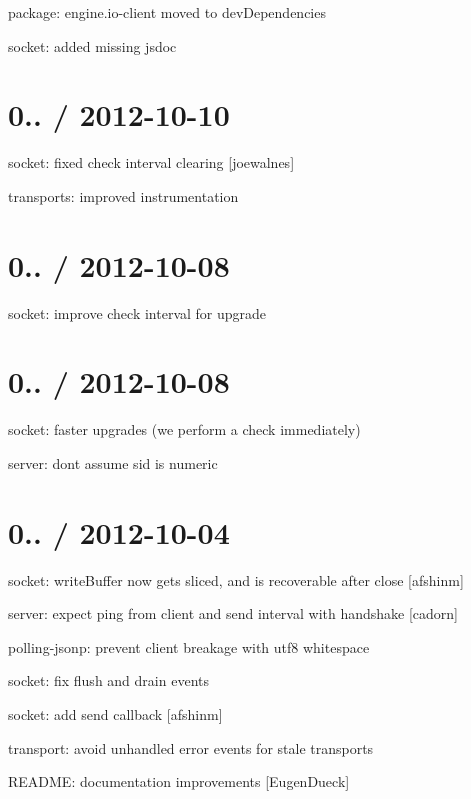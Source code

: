 \begin{DoxyItemize}
\item package\+: {\ttfamily engine.\+io-\/client} moved to {\ttfamily dev\+Dependencies}
\item socket\+: added missing jsdoc
\end{DoxyItemize}

\section*{0.. / 2012-\/10-\/10 }


\begin{DoxyItemize}
\item socket\+: fixed check interval clearing \mbox{[}joewalnes\mbox{]}
\item transports\+: improved instrumentation
\end{DoxyItemize}

\section*{0.. / 2012-\/10-\/08 }


\begin{DoxyItemize}
\item socket\+: improve check interval for upgrade
\end{DoxyItemize}

\section*{0.. / 2012-\/10-\/08 }


\begin{DoxyItemize}
\item socket\+: faster upgrades (we perform a check immediately)
\item server\+: don\textquotesingle{}t assume sid is numeric
\end{DoxyItemize}

\section*{0.. / 2012-\/10-\/04 }


\begin{DoxyItemize}
\item socket\+: {\ttfamily write\+Buffer} now gets sliced, and is recoverable after {\ttfamily close} \mbox{[}afshinm\mbox{]}
\item server\+: expect ping from client and send interval with handshake \mbox{[}cadorn\mbox{]}
\item polling-\/jsonp\+: prevent client breakage with utf8 whitespace
\item socket\+: fix {\ttfamily flush} and {\ttfamily drain} events
\item socket\+: add {\ttfamily send} callback \mbox{[}afshinm\mbox{]}
\item transport\+: avoid unhandled error events for stale transports
\item R\+E\+A\+D\+ME\+: documentation improvements \mbox{[}Eugen\+Dueck\mbox{]}
\end{DoxyItemize}


